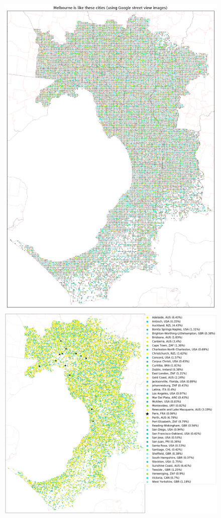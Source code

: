 \documentclass[final,3p,times,authoryear]{elsarticle}
\begin{document}

\begin{figure}[!htbp]
\centering    
\includegraphics[scale=0.25]{Images/MelbourneOverall_street.png} 
\includegraphics[scale=0.25]{Images/MelbourneOverallAbrev_street.png} 

\end{figure}
\end{document}
